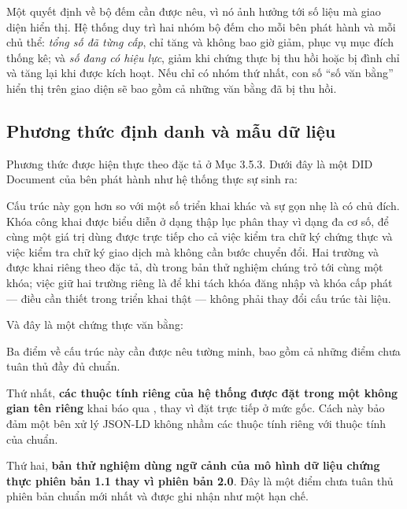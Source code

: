 Một quyết định về bộ đếm cần được nêu, vì nó ảnh hưởng tới số liệu mà giao diện hiển thị. Hệ thống duy trì hai nhóm bộ đếm cho mỗi bên phát hành và mỗi chủ thể: \emph{tổng số đã từng cấp}, chỉ tăng và không bao giờ giảm, phục vụ mục đích thống kê; và \emph{số đang có hiệu lực}, giảm khi chứng thực bị thu hồi hoặc bị đình chỉ và tăng lại khi được kích hoạt. Nếu chỉ có nhóm thứ nhất, con số {``}số văn bằng{''} hiển thị trên giao diện sẽ bao gồm cả những văn bằng đã bị thu hồi.

\subsection{Phương thức định danh và mẫu dữ liệu}

Phương thức  được hiện thực theo đặc tả ở Mục 3.5.3. Dưới đây là một DID Document của bên phát hành như hệ thống thực sự sinh ra:



Cấu trúc này gọn hơn so với một số triển khai khác và sự gọn nhẹ là có chủ đích. Khóa công khai được biểu diễn ở dạng thập lục phân thay vì dạng đa cơ số, để cùng một giá trị dùng được trực tiếp cho cả việc kiểm tra chữ ký chứng thực và việc kiểm tra chữ ký giao dịch mà không cần bước chuyển đổi. Hai trường  và  được khai riêng theo đặc tả, dù trong bản thử nghiệm chúng trỏ tới cùng một khóa; việc giữ hai trường riêng là để khi tách khóa đăng nhập và khóa cấp phát --- điều cần thiết trong triển khai thật --- không phải thay đổi cấu trúc tài liệu.

Và đây là một chứng thực văn bằng:



Ba điểm về cấu trúc này cần được nêu tường minh, bao gồm cả những điểm chưa tuân thủ đầy đủ chuẩn.

Thứ nhất, \textbf{các thuộc tính riêng của hệ thống được đặt trong một không gian tên riêng} khai báo qua , thay vì đặt trực tiếp ở mức gốc. Cách này bảo đảm một bên xử lý JSON-LD không nhầm các thuộc tính riêng với thuộc tính của chuẩn.

Thứ hai, \textbf{bản thử nghiệm dùng ngữ cảnh của mô hình dữ liệu chứng thực phiên bản 1.1 thay vì phiên bản 2.0}. Đây là một điểm chưa tuân thủ phiên bản chuẩn mới nhất \cite{W3C_VCDM2025} và được ghi nhận như một hạn chế.


